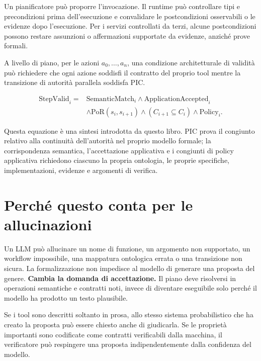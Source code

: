 \documentclass[10pt,oneside,openany]{book}
\begin{document}
Un pianificatore può proporre l'invocazione. Il runtime può controllare tipi e precondizioni prima dell'esecuzione e convalidare le postcondizioni osservabili o le evidenze dopo l'esecuzione. Per i servizi controllati da terzi, alcune postcondizioni possono restare assunzioni o affermazioni supportate da evidenze, anziché prove formali.

A livello di piano, per le azioni $a_0,\ldots,a_n$, una condizione architetturale di validità può richiedere che ogni azione soddisfi il contratto del proprio tool mentre la transizione di autorità parallela soddisfa PIC.
\begin{formulabox}
\[
\begin{aligned}
\mathrm{StepValid}_i={}&\mathrm{SemanticMatch}_i
\land \mathrm{ApplicationAccepted}_i\\
&\land \mathrm{PoR}(s_i,s_{i+1})
\land (C_{i+1}\subseteq C_i)
\land \mathrm{Policy}_i.
\end{aligned}
\]
\end{formulabox}
Questa equazione è una sintesi introdotta da questo libro. PIC prova il congiunto relativo alla continuità dell'autorità nel proprio modello formale; la corrispondenza semantica, l'accettazione applicativa e i congiunti di policy applicativa richiedono ciascuno la propria ontologia, le proprie specifiche, implementazioni, evidenze e argomenti di verifica.

\section{Perché questo conta per le allucinazioni}
Un LLM può allucinare un nome di funzione, un argomento non supportato, un workflow impossibile, una mappatura ontologica errata o una transizione non sicura. La formalizzazione non impedisce al modello di generare una proposta del genere. \textbf{Cambia la domanda di accettazione.} Il piano deve risolversi in operazioni semantiche e contratti noti, invece di diventare eseguibile solo perché il modello ha prodotto un testo plausibile.

Se i tool sono descritti soltanto in prosa, allo stesso sistema probabilistico che ha creato la proposta può essere chiesto anche di giudicarla. Se le proprietà importanti sono codificate come contratti verificabili dalla macchina, il verificatore può respingere una proposta indipendentemente dalla confidenza del modello.
\end{document}
